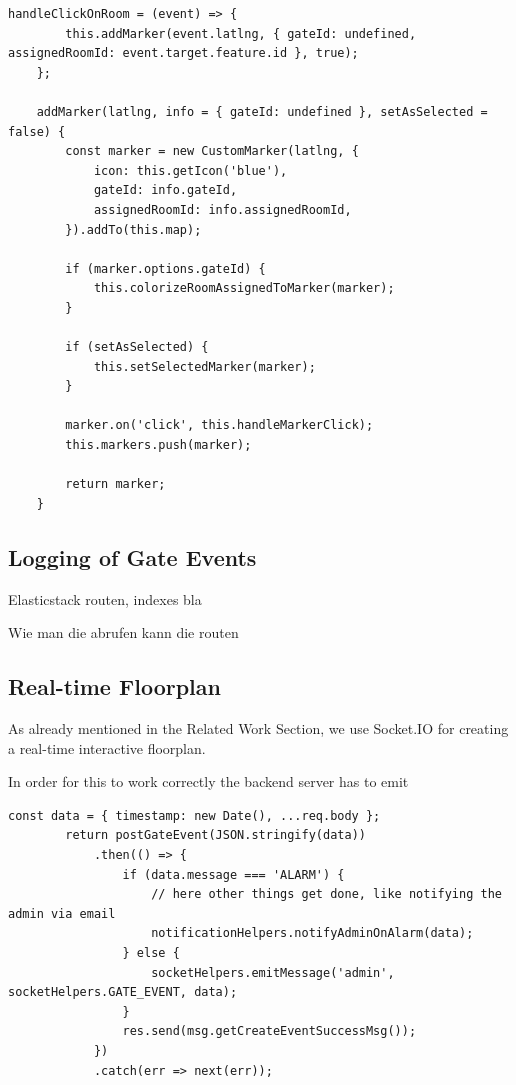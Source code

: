 \begin{lstlisting}[label=addMarkers]
handleClickOnRoom = (event) => {
        this.addMarker(event.latlng, { gateId: undefined, assignedRoomId: event.target.feature.id }, true);
    };

    addMarker(latlng, info = { gateId: undefined }, setAsSelected = false) {
        const marker = new CustomMarker(latlng, {
            icon: this.getIcon('blue'),
            gateId: info.gateId,
            assignedRoomId: info.assignedRoomId,
        }).addTo(this.map);

        if (marker.options.gateId) {
            this.colorizeRoomAssignedToMarker(marker);
        }

        if (setAsSelected) {
            this.setSelectedMarker(marker);
        }

        marker.on('click', this.handleMarkerClick);
        this.markers.push(marker);

        return marker;
    }
\end{lstlisting}

\subsection{Logging of Gate Events}
\label{Logging of Gate Events}

Elasticstack routen, indexes bla

Wie man die abrufen kann die routen

\subsection{Real-time Floorplan}
\label{Real-time Floorplan}

As already mentioned in the Related Work Section, we use Socket.IO for creating a real-time interactive floorplan. 

In order for this to work correctly the backend server has to emit 

\begin{lstlisting}[label=socketIOServerSide]
const data = { timestamp: new Date(), ...req.body };
        return postGateEvent(JSON.stringify(data))
            .then(() => {
                if (data.message === 'ALARM') {
                    // here other things get done, like notifying the admin via email
                    notificationHelpers.notifyAdminOnAlarm(data);
                } else {
                    socketHelpers.emitMessage('admin', socketHelpers.GATE_EVENT, data);
                }
                res.send(msg.getCreateEventSuccessMsg());
            })
            .catch(err => next(err));
\end{lstlisting}

